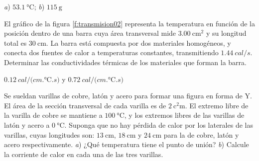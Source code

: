 \begin{Answer}
	\begin{minipage}[t]{.4\textwidth}
    \textit{a}) $\SI{53.1}{\celsius}$; \textit{b}) $\SI{115}{\gram}$
  \end{minipage}
\end{Answer}
%
\begin{Exercise}\label{p:transmision02}
  El gráfico de la figura \ref{f:transmision02} representa la temperatura en función de la posición dentro de una barra cuya área transversal mide $\SI{3.00}{\centi\metre\squared}$ y su longitud total es $\SI{30}{\centi\metre}$. La barra está compuesta por dos materiales homogéneos, y conecta dos fuentes de calor a temperaturas constantes, transmitiendo $\SI{1.44}{cal/s}$. Determinar las conductividades térmicas de los materiales que forman la barra.
\end{Exercise}
\begin{Answer}
	\begin{minipage}[t]{.4\textwidth}
    $\SI{0.12}{cal/(cm.\celsius.s)}$ y $\SI{0.72}{cal/(cm.\celsius.s)}$
  \end{minipage}
\end{Answer}
%
\begin{center}
\end{center}
%
\begin{Exercise}
  Se sueldan varillas de cobre, latón y acero para formar una figura en forma de Y. El área de la sección transversal de cada varilla es de $\SI{2}{\square\centi\metre}$. El extremo libre de la varilla de cobre se mantiene a $\SI{100}{\celsius}$, y los extremos libres de las varillas de latón y acero a $\SI{0}{\celsius}$. Suponga que no hay pérdida de calor por los laterales de las varillas, cuyas longitudes son: $\SI{13}{\centi\metre}$, $\SI{18}{\centi\metre}$ y $\SI{24}{\centi\metre}$ para la de cobre, latón y acero respectivamente. \textit{a}) ¿Qué temperatura tiene el punto de unión? \textit{b}) Calcule la corriente de calor en cada una de las tres varillas.
\end{Exercise}
